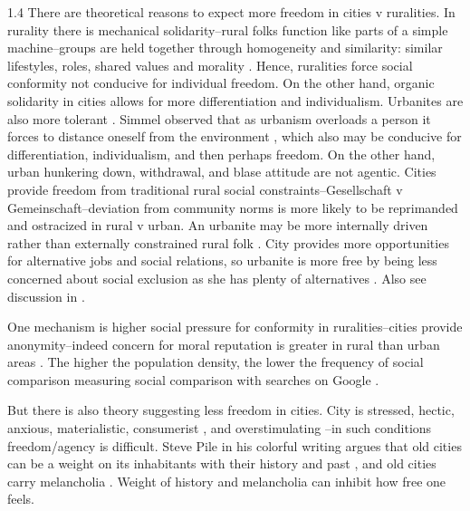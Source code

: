 \documentclass[10pt, letterpaper]{article}
\begin{document}
\begin{spacing}{1.4}
There are theoretical reasons to expect more freedom in cities v ruralities. 
In rurality there is mechanical solidarity--rural folks function like parts of a
simple machine--groups are held together through homogeneity and similarity:
similar lifestyles, roles, shared values and morality \citep{durkheim97}. Hence,
 ruralities force social
conformity not conducive for individual freedom. On the other hand, organic
solidarity in cities allows for more differentiation and individualism. %
 Urbanites are also more tolerant \citep{tuch87}.
% 
Simmel observed that as urbanism overloads a person it forces to
distance oneself from the environment \citep{simmel03}, which also may be
conducive for differentiation, individualism,  %
 and then perhaps freedom. On the other hand, urban hunkering down, withdrawal,
 and blase attitude \citep{simmel03} are not agentic.  
%
% 
Cities provide freedom from traditional rural social constraints--Gesellschaft v
Gemeinschaft--deviation from community norms is more likely to be reprimanded
and ostracized in rural v urban.
An urbanite may be more internally driven rather than
externally constrained rural folk \citep{yamagishi12}. %
 City provides more opportunities for alternative jobs and social relations, so
 urbanite is more free by being less concerned about social exclusion as she has
 plenty of alternatives \citep{yamagishi12}. Also see 
 discussion in \citet{luca2023progressive}. %
 
 One mechanism is higher social pressure for conformity in ruralities--cities
 provide anonymity--indeed concern for moral reputation is greater in rural than urban areas
 \citep[Danielson et al 2023 cited in][]{aokOttCh26}. The higher the population
 density, the lower the frequency of social comparison measuring social
 comparison with searches on Google \citep[][]{aokOttCh26}.   
 
 But there is also theory suggesting less freedom in cities.
 City %
 is stressed, hectic, anxious, materialistic, consumerist
 \citep{aokCityBook15}, and overstimulating \citep{simmel03,lederbogen11}--in such conditions freedom/agency is
difficult.
  Steve Pile in his colorful writing  argues that old cities can be a weight on its inhabitants with their
 history and past \citep{pile05,pile05B,pile99}, and  old cities carry
 melancholia \citep{pile05B}. Weight of history and melancholia can inhibit how
 free one feels.


\end{spacing}
\end{document}
